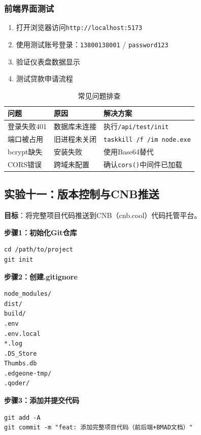 \subsubsection*{前端界面测试}

\begin{enumerate}[leftmargin=2em]
  \item 打开浏览器访问\texttt{http://localhost:5173}
  \item 使用测试账号登录：\texttt{13800138001} / \texttt{password123}
  \item 验证仪表盘数据显示
  \item 测试贷款申请流程
\end{enumerate}

\begin{table}[H]
\centering
\begin{tabular}{lll}
\toprule
\textbf{问题} & \textbf{原因} & \textbf{解决方案} \\
\midrule
登录失败401 & 数据库未连接 & 执行\texttt{/api/test/init} \\
端口被占用 & 旧进程未关闭 & \texttt{taskkill /f /im node.exe} \\
bcrypt缺失 & 安装失败 & 使用Base64替代 \\
CORS错误 & 跨域未配置 & 确认\texttt{cors()}中间件已加载 \\
\bottomrule
\end{tabular}
\caption{常见问题排查}
\end{table}

\subsection{实验十一：版本控制与CNB推送}

\textbf{目标}：将完整项目代码推送到CNB（cnb.cool）代码托管平台。

\textbf{步骤1：初始化Git仓库}

\begin{lstlisting}[style=shell]
cd /path/to/project
git init
\end{lstlisting}

\textbf{步骤2：创建.gitignore}

\begin{lstlisting}
node_modules/
dist/
build/
.env
.env.local
*.log
.DS_Store
Thumbs.db
.edgeone-tmp/
.qoder/
\end{lstlisting}

\textbf{步骤3：添加并提交代码}

\begin{lstlisting}[style=shell]
git add -A
git commit -m "feat: 添加完整项目代码（前后端+BMAD文档）"
\end{lstlisting}

